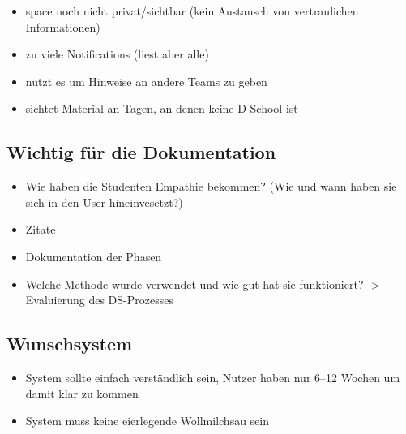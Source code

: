 \begin{itemize}
\item space noch nicht privat\slash sichtbar (kein Austausch von vertraulichen Informationen)
\item zu viele Notifications (liest aber alle)
\item nutzt es um Hinweise an andere Teams zu geben
\item sichtet Material an Tagen, an denen keine D-School ist
\end{itemize}

\subsection*{Wichtig für die Dokumentation}
\label{wichtigfuerdiedokumentation}

\begin{itemize}
\item Wie haben die Studenten Empathie bekommen? (Wie und wann haben sie sich in den User hineinvesetzt?)
\item Zitate
\item Dokumentation der Phasen
\item Welche Methode wurde verwendet und wie gut hat sie funktioniert? -> Evaluierung des DS-Prozesses
\end{itemize}

\subsection*{Wunschsystem}
\label{wunschsystem}

\begin{itemize}
\item System sollte einfach verständlich sein, Nutzer haben nur 6--12 Wochen um damit klar zu kommen
\item System muss keine eierlegende Wollmilchsau sein
\end{itemize}



